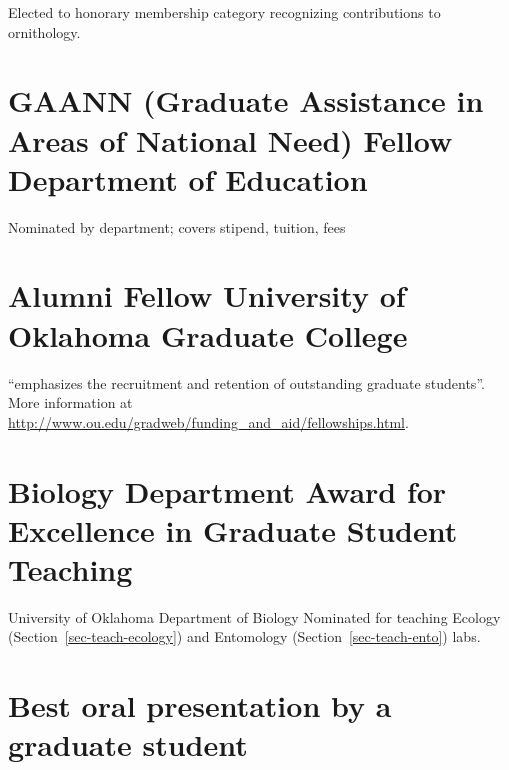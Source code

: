 \documentclass[
  letterpaper,
  DIV=11,
  numbers=noendperiod,
  oneside]{scrreprt}
\begin{document}
Elected to honorary membership category recognizing contributions to
ornithology.

\section{GAANN (Graduate Assistance in Areas of National Need) Fellow
Department of
Education}\label{gaann-graduate-assistance-in-areas-of-national-need-fellow-department-of-education}


Nominated by department; covers stipend, tuition, fees

\section{Alumni Fellow University of Oklahoma Graduate
College}\label{alumni-fellow-university-of-oklahoma-graduate-college}


``emphasizes the recruitment and retention of outstanding graduate
students''. More information at
\url{http://www.ou.edu/gradweb/funding_and_aid/fellowships.html}.

\section{Biology Department Award for Excellence in Graduate Student
Teaching}\label{biology-department-award-for-excellence-in-graduate-student-teaching}


University of Oklahoma Department of Biology Nominated for teaching
Ecology (Section~\ref{sec-teach-ecology}) and Entomology
(Section~\ref{sec-teach-ento}) labs.

\section{Best oral presentation by a graduate
student}\label{best-oral-presentation-by-a-graduate-student}
\end{document}
